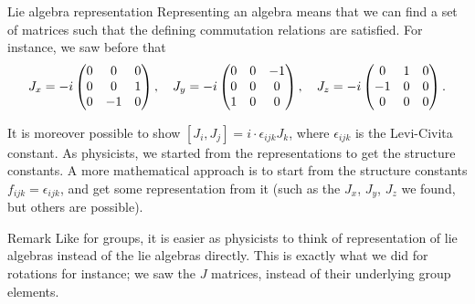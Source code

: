 \documentclass[a4paper]{article}
\begin{document}
\begin{parag}{Lie algebra representation}
    Representing an algebra means that we can find a set of matrices such that the defining commutation relations are satisfied. For instance, we saw before that 
    \[J_x = -i \begin{pmatrix} 0 & 0 & 0 \\ 0 & 0 & 1 \\ 0 & -1 & 0 \end{pmatrix}, \quad J_y = -i \begin{pmatrix} 0 & 0 & -1 \\ 0 & 0 & 0 \\ 1 & 0 & 0 \end{pmatrix}, \quad J_z = -i \begin{pmatrix} 0 & 1 & 0 \\ -1 & 0 & 0 \\ 0 & 0 & 0 \end{pmatrix}.\]

    It is moreover possible to show $\left[J_i, J_j\right] = i\cdot \epsilon_{ijk} J_k$, where $\epsilon_{ijk}$ is the Levi-Civita constant. As physicists, we started from the representations to get the structure constants. A more mathematical approach is to start from the structure constants $f_{ijk} = \epsilon_{ijk}$, and get some representation from it (such as the $J_x$, $J_y$, $J_z$ we found, but others are possible).

    \begin{subparag}{Remark}
        Like for groups, it is easier as physicists to think of representation of lie algebras instead of the lie algebras directly. This is exactly what we did for rotations for instance; we saw the $J$ matrices, instead of their underlying group elements.
    \end{subparag}
\end{parag}
\end{document}
